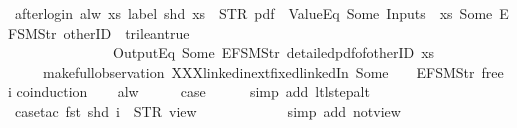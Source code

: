 \begin{isabellebody}
\endisatagproof
{\isafoldproof}%
%
\isadelimproof
\isanewline
%
\endisadelimproof
\isanewline
{}\isamarkupfalse%
\ after{\isacharunderscore}login{\isacharcolon}\ {\isachardoublequoteopen}alw\ {\isacharparenleft}{\isasymlambda}xs{\isachardot}\ label\ {\isacharparenleft}shd\ xs{\isacharparenright}\ {\isacharequal}\ STR\ {\isacharprime}{\isacharprime}pdf{\isacharprime}{\isacharprime}\ {\isasymand}\ ValueEq\ {\isacharparenleft}Some\ {\isacharparenleft}Inputs\ {}\ xs{\isacharparenright}{\isacharparenright}\ {\isacharparenleft}Some\ {\isacharparenleft}EFSM{\isachardot}Str\ {\isacharprime}{\isacharprime}otherID{\isacharprime}{\isacharprime}{\isacharparenright}{\isacharparenright}\ {\isacharequal}\ trilean{\isachardot}true\ {\isasymlongrightarrow}\isanewline
\ \ \ \ \ \ \ \ \ \ \ \ \ \ {\isasymnot}\ OutputEq\ {\isacharbrackleft}Some\ {\isacharparenleft}EFSM{\isachardot}Str\ {\isacharprime}{\isacharprime}detailed{\isacharunderscore}pdf{\isacharunderscore}of{\isacharunderscore}otherID{\isacharprime}{\isacharprime}{\isacharparenright}{\isacharbrackright}\ xs{\isacharparenright}\isanewline
\ \ \ \ \ {\isacharparenleft}make{\isacharunderscore}full{\isacharunderscore}observation\ XXXlinkedin{\isacharunderscore}ext{\isacharunderscore}fixed{\isachardot}linkedIn\ {\isacharparenleft}Some\ {}{\isacharparenright}\ {\isacharparenleft}{\isacharless}{\isachargreater}{\isacharparenleft}{}\ {\isacharcolon}{\isacharequal}\ EFSM{\isachardot}Str\ {\isacharprime}{\isacharprime}free{\isacharprime}{\isacharprime}{\isacharparenright}{\isacharparenright}\ i{\isacharparenright}{\isachardoublequoteclose}\isanewline
%
\isadelimproof
%
\endisadelimproof
%
\isatagproof
{}\isamarkupfalse%
{\isacharparenleft}coinduction{\isacharparenright}\isanewline
\ \ \isamarkupfalse%
\ alw\isanewline
\ \ \isamarkupfalse%
\ \isamarkupfalse%
\ {\isacharquery}case\isanewline
\ \ \ \ \isamarkupfalse%
\ {\isacharparenleft}simp\ add{\isacharcolon}\ ltl{\isacharunderscore}step{\isacharunderscore}alt{\isacharparenright}\isanewline
\ \ \ \ \isamarkupfalse%
\ {\isacharparenleft}case{\isacharunderscore}tac\ {\isachardoublequoteopen}{\isacharparenleft}fst\ {\isacharparenleft}shd\ i{\isacharparenright}{\isacharparenright}\ {\isacharequal}\ STR\ {\isacharprime}{\isacharprime}view{\isacharprime}{\isacharprime}{\isachardoublequoteclose}{\isacharparenright}\isanewline
\ \ \ \ \ \isamarkupfalse%
\isanewline
\ \ \ \ \ \isamarkupfalse%
\ {\isacharparenleft}simp\ add{\isacharcolon}\ not{\isacharunderscore}view{\isacharunderscore}{}{\isacharparenright}\isanewline

\end{isabellebody}
